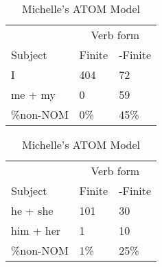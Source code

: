 \begin{table}[]
    \caption{Michelle's ATOM Model}
    \begin{minipage}{0.5\textwidth}
    \centering
    \begin{tabular}{@{}lll@{}}
        \toprule
         &\multicolumn{2}{c}{Verb form}\\
         \cline{2-3}
        Subject & Finite & -Finite \\
        \midrule
        I & 404 & 72 \\
        me + my & 0 & 59 \\
        \hline
        \%non-NOM & 0\% & 45\% \\
        \bottomrule
    \end{tabular}
\end{minipage}
\begin{minipage}{0.5\textwidth}
    \centering
    \begin{tabular}{@{}lll@{}}
        \toprule
         &\multicolumn{2}{c}{Verb form}\\
         \cline{2-3}
        Subject & Finite & -Finite \\
        \midrule
        he + she & 101 & 30 \\
        him + her & 1 & 10 \\
        \hline
        \%non-NOM & 1\% & 25\% \\
        \bottomrule
    \end{tabular}
    \end{minipage}
    \begin{minipage}{0.5\textwidth}
    

\end{minipage}
\end{table}

